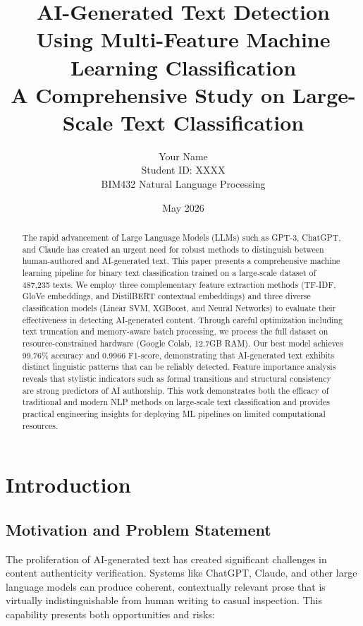 \documentclass[12pt, a4paper]{article}
\title{\textbf{AI-Generated Text Detection Using Multi-Feature Machine Learning Classification} \\
\large A Comprehensive Study on Large-Scale Text Classification}
\author{Your Name \\ Student ID: XXXX \\ BIM432 Natural Language Processing}
\date{May 2026}
\begin{document}
\maketitle

\begin{abstract}
The rapid advancement of Large Language Models (LLMs) such as GPT-3, ChatGPT, and Claude has created an urgent need for robust methods to distinguish between human-authored and AI-generated text. This paper presents a comprehensive machine learning pipeline for binary text classification trained on a large-scale dataset of 487,235 texts. We employ three complementary feature extraction methods (TF-IDF, GloVe embeddings, and DistilBERT contextual embeddings) and three diverse classification models (Linear SVM, XGBoost, and Neural Networks) to evaluate their effectiveness in detecting AI-generated content. Through careful optimization including text truncation and memory-aware batch processing, we process the full dataset on resource-constrained hardware (Google Colab, 12.7GB RAM). Our best model achieves 99.76\% accuracy and 0.9966 F1-score, demonstrating that AI-generated text exhibits distinct linguistic patterns that can be reliably detected. Feature importance analysis reveals that stylistic indicators such as formal transitions and structural consistency are strong predictors of AI authorship. This work demonstrates both the efficacy of traditional and modern NLP methods on large-scale text classification and provides practical engineering insights for deploying ML pipelines on limited computational resources.
\end{abstract}

\tableofcontents
\newpage

\section{Introduction}

\subsection{Motivation and Problem Statement}

The proliferation of AI-generated text has created significant challenges in content authenticity verification. Systems like ChatGPT, Claude, and other large language models can produce coherent, contextually relevant prose that is virtually indistinguishable from human writing to casual inspection. This capability presents both opportunities and risks:
\end{document}
